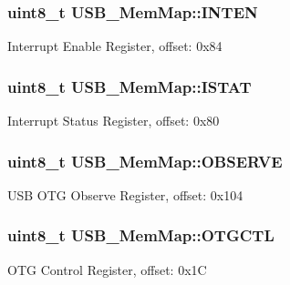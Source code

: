 \subsubsection[{I\+N\+T\+E\+N}]{\setlength{\rightskip}{0pt plus 5cm}uint8\+\_\+t U\+S\+B\+\_\+\+Mem\+Map\+::\+I\+N\+T\+E\+N}\label{struct_u_s_b___mem_map_aa19462850c5085330e53ed19397f6e1e}
Interrupt Enable Register, offset\+: 0x84 \hypertarget{struct_u_s_b___mem_map_aa88345921ba963631cba089504b96c19}{}
\subsubsection[{I\+S\+T\+A\+T}]{\setlength{\rightskip}{0pt plus 5cm}uint8\+\_\+t U\+S\+B\+\_\+\+Mem\+Map\+::\+I\+S\+T\+A\+T}\label{struct_u_s_b___mem_map_aa88345921ba963631cba089504b96c19}
Interrupt Status Register, offset\+: 0x80 \hypertarget{struct_u_s_b___mem_map_a1bf837fd42e907a712c9f8e7261ea10d}{}
\subsubsection[{O\+B\+S\+E\+R\+V\+E}]{\setlength{\rightskip}{0pt plus 5cm}uint8\+\_\+t U\+S\+B\+\_\+\+Mem\+Map\+::\+O\+B\+S\+E\+R\+V\+E}\label{struct_u_s_b___mem_map_a1bf837fd42e907a712c9f8e7261ea10d}
U\+S\+B O\+T\+G Observe Register, offset\+: 0x104 \hypertarget{struct_u_s_b___mem_map_a615eaa9b0200d66323e8ee2650a49164}{}
\subsubsection[{O\+T\+G\+C\+T\+L}]{\setlength{\rightskip}{0pt plus 5cm}uint8\+\_\+t U\+S\+B\+\_\+\+Mem\+Map\+::\+O\+T\+G\+C\+T\+L}\label{struct_u_s_b___mem_map_a615eaa9b0200d66323e8ee2650a49164}
O\+T\+G Control Register, offset\+: 0x1\+C \hypertarget{struct_u_s_b___mem_map_a4cd829d73e01b3cf0a4fa9affedb210f}{}
